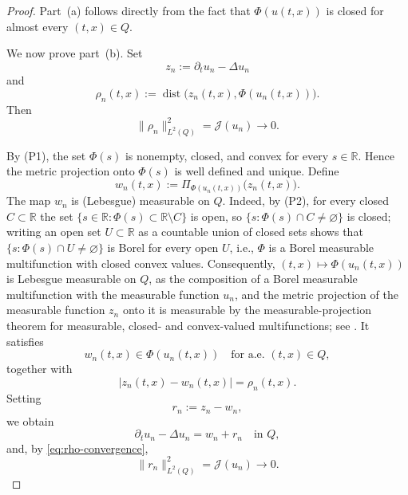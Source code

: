 \documentclass[11pt]{elsarticle}
\theoremstyle{definition}
\theoremstyle{remark}
\numberwithin{equation}{section}
\begin{document}
	\begin{proof}
		Part~\textup{(a)} follows directly from the fact that
		$\Phi(u(t,x))$ is closed for almost every $(t,x)\in Q$. 
		
		We now prove part~\textup{(b)}. Set
		\[
		z_n:=\partial_tu_n-\Delta u_n
		\]
		and
		\[
		\rho_n(t,x)
		:=
		\operatorname{dist}
		\bigl(z_n(t,x),\Phi(u_n(t,x))\bigr).
		\]
		Then
		\begin{equation}
		\|\rho_n\|_{L^2(Q)}^2
		=
		\mathcal{J}(u_n)
		\longrightarrow 0.
		\label{eq:rho-convergence}
		\end{equation}
		
		By \textup{(P1)}, the set $\Phi(s)$ is nonempty, closed, and convex
		for every $s\in\mathbb{R}$. Hence the metric projection onto
		$\Phi(s)$ is well defined and unique. Define
		\[
		w_n(t,x)
		:=
		\Pi_{\Phi(u_n(t,x))}
		\bigl(z_n(t,x)\bigr).
		\]
		The map $w_n$ is (Lebesgue) measurable on $Q$. Indeed, by
		\textup{(P2)}, for every closed $C\subset\mathbb{R}$ the set
		$\{s\in\mathbb{R}:\Phi(s)\subset\mathbb{R}\setminus C\}$ is open,
		so $\{s:\Phi(s)\cap C\neq\varnothing\}$ is closed; writing an open
		set $U\subset\mathbb{R}$ as a countable union of closed sets shows
		that $\{s:\Phi(s)\cap U\neq\varnothing\}$ is Borel for every open
		$U$, i.e., $\Phi$ is a Borel measurable multifunction with closed
		convex values. Consequently, $(t,x)\mapsto\Phi(u_n(t,x))$ is
		Lebesgue measurable on $Q$, as the composition of a Borel measurable
		multifunction with the measurable function $u_n$, and the metric
		projection of the measurable function $z_n$ onto it is measurable by
		the measurable-projection theorem for measurable, closed- and
		convex-valued multifunctions; see
		\cite[Theorem~8.2.11]{aubin_frankowska_2009}. It satisfies
		\[
		w_n(t,x)\in\Phi(u_n(t,x))
		\quad\text{for a.e. }(t,x)\in Q,
		\]
		together with
		\[
		|z_n(t,x)-w_n(t,x)|
		=
		\rho_n(t,x).
		\]
		Setting
		\[
		r_n:=z_n-w_n,
		\]
		we obtain
		\begin{equation}
		\partial_tu_n-\Delta u_n=w_n+r_n
		\quad\text{in }Q,
		\label{eq:pde-decomposition}
		\end{equation}
		and, by \eqref{eq:rho-convergence},
		\begin{equation}
		\|r_n\|_{L^2(Q)}^2
		=
		\mathcal{J}(u_n)
		\longrightarrow 0.
		\label{eq:rn-convergence}
		\end{equation}
		

\end{proof}
\end{document}
